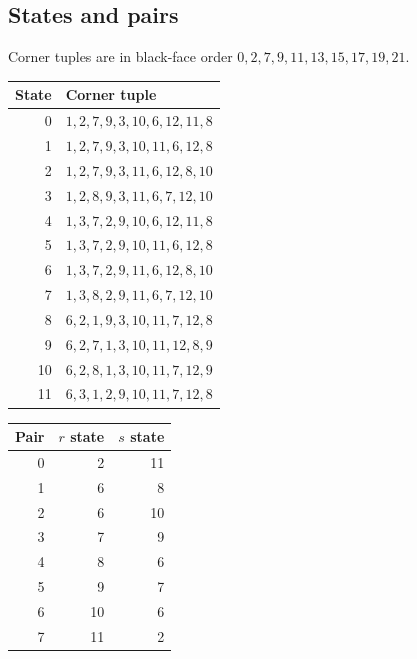 \subsection*{States and pairs}
Corner tuples are in black-face order $0,2,7,9,11,13,15,17,19,21$.
\begin{center}\small\begin{tabular}{rl}\toprule State & Corner tuple\\\midrule
0 & $1,2,7,9,3,10,6,12,11,8$\\
1 & $1,2,7,9,3,10,11,6,12,8$\\
2 & $1,2,7,9,3,11,6,12,8,10$\\
3 & $1,2,8,9,3,11,6,7,12,10$\\
4 & $1,3,7,2,9,10,6,12,11,8$\\
5 & $1,3,7,2,9,10,11,6,12,8$\\
6 & $1,3,7,2,9,11,6,12,8,10$\\
7 & $1,3,8,2,9,11,6,7,12,10$\\
8 & $6,2,1,9,3,10,11,7,12,8$\\
9 & $6,2,7,1,3,10,11,12,8,9$\\
10 & $6,2,8,1,3,10,11,7,12,9$\\
11 & $6,3,1,2,9,10,11,7,12,8$\\
\bottomrule\end{tabular}\qquad\begin{tabular}{rrr}\toprule Pair & $r$ state & $s$ state\\\midrule
0 & 2 & 11\\
1 & 6 & 8\\
2 & 6 & 10\\
3 & 7 & 9\\
4 & 8 & 6\\
5 & 9 & 7\\
6 & 10 & 6\\
7 & 11 & 2\\
\bottomrule\end{tabular}\end{center}
\clearpage\small
